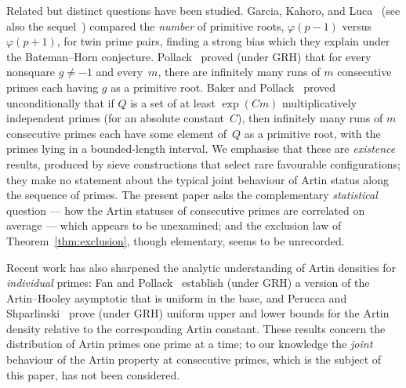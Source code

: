 \documentclass[11pt]{amsart}
\theoremstyle{definition}
\begin{document}
Related but distinct questions have been studied. Garcia, Kahoro, and
Luca~\cite{GarciaKahoroLuca2019} (see also the sequel~\cite{GarciaLucaShiUdell2020})
compared the \emph{number} of primitive roots, $\varphi(p-1)$ versus
$\varphi(p+1)$, for twin prime pairs, finding a strong bias which they explain
under the Bateman--Horn conjecture. Pollack~\cite{Pollack2014} proved
(under GRH) that for every nonsquare $g \neq -1$ and every~$m$, there are
infinitely many runs of $m$ consecutive primes each having $g$ as a primitive
root. Baker and Pollack~\cite{BakerPollack2016} proved unconditionally that
if $Q$ is a set of at least $\exp(Cm)$ multiplicatively independent primes
(for an absolute constant~$C$), then infinitely many runs of $m$ consecutive
primes each have some element of~$Q$ as a primitive root, with the primes
lying in a bounded-length interval.
We emphasise that these are
\emph{existence} results, produced by sieve constructions that select rare
favourable configurations; they make no statement about the typical joint
behaviour of Artin status along the sequence of primes. The present paper asks
the complementary \emph{statistical} question --- how the Artin statuses of
consecutive primes are correlated on average --- which appears to be
unexamined; and the exclusion law of Theorem~\ref{thm:exclusion}, though
elementary, seems to be unrecorded.

Recent work has also sharpened the analytic understanding of Artin densities
for \emph{individual} primes: Fan and Pollack~\cite{FanPollack2025} establish
(under GRH) a version of the Artin--Hooley asymptotic that is uniform in the
base, and Perucca and Shparlinski~\cite{PeruccaShparlinski2025} prove (under GRH) uniform
upper and lower bounds for the Artin density relative to the corresponding
Artin constant. These results concern the distribution of Artin primes one
prime at a time; to our knowledge the \emph{joint} behaviour of the Artin
property at consecutive primes, which is the subject of this paper, has not
been considered.
\end{document}
